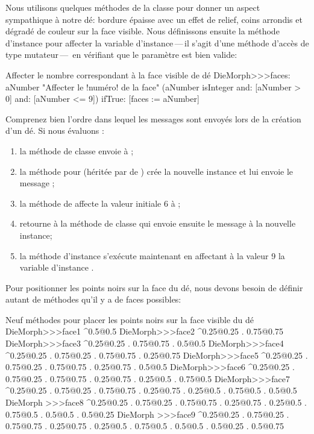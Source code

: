 \documentclass[a4paper,10pt,twoside]{book}
\begin{document}
Nous utilisons quelques méthodes de la classe 
pour donner un aspect sympathique à notre dé: bordure épaisse
avec un effet de relief, coins arrondis et dégradé de couleur sur
la face visible.
Nous définissons ensuite la méthode d'instance  pour
affecter la variable d'instance\,---\,il s'agit d'une méthode
d'accès de type mutateur\,---\, en vérifiant que le paramètre est
bien valide:
\begin{method}{Affecter le nombre correspondant à la face visible de dé}
DieMorph>>>faces: aNumber
	"Affecter le !numéro! de la face"
	(aNumber isInteger
			and: [aNumber > 0]
			and: [aNumber <= 9])
		ifTrue: [faces := aNumber]
\end{method}

Comprenez bien l'ordre dans lequel les messages sont envoyés lors de
la création d'un dé. Si nous évaluons :
\begin{enumerate}
	\item la méthode de classe  envoie
       à ;
	\item la méthode pour  (héritée par  de ) crée la nouvelle instance et lui envoie
       le message ;
	\item la méthode  de  affecte la
      valeur initiale 6 à ;
	\item {} retourne à la méthode de
      classe  qui envoie ensuite le
      message  à la nouvelle instance;
	\item la méthode d'instance  s'exécute
      maintenant en affectant à la valeur 9 la variable d'instance
      .
\end{enumerate}

Pour positionner les points noirs sur la face du dé, nous devons
besoin de définir autant de méthodes qu'il y a de faces possibles:

\begin{methods}{Neuf méthodes pour placer les points noirs sur la face visible du dé}
DieMorph>>>face1
	^{0.5@0.5}
DieMorph>>>face2
	^{0.25@0.25 . 0.75@0.75}
DieMorph>>>face3
	^{0.25@0.25 . 0.75@0.75 . 0.5@0.5}
DieMorph>>>face4
	^{0.25@0.25 . 0.75@0.25 . 0.75@0.75 . 0.25@0.75}
DieMorph>>>face5
	^{0.25@0.25 . 0.75@0.25 . 0.75@0.75 . 0.25@0.75 . 0.5@0.5}
DieMorph>>>face6
	^{0.25@0.25 . 0.75@0.25 . 0.75@0.75 . 0.25@0.75 . 0.25@0.5 . 0.75@0.5}
DieMorph>>>face7
	^{0.25@0.25 . 0.75@0.25 . 0.75@0.75 . 0.25@0.75 . 0.25@0.5 . 0.75@0.5 . 0.5@0.5}
DieMorph >>>face8
	^{0.25@0.25 . 0.75@0.25 . 0.75@0.75 . 0.25@0.75 . 0.25@0.5 . 0.75@0.5 . 0.5@0.5 . 0.5@0.25}
DieMorph >>>face9
	^{0.25@0.25 . 0.75@0.25 . 0.75@0.75 . 0.25@0.75 . 0.25@0.5 . 0.75@0.5 . 0.5@0.5 . 0.5@0.25 . 0.5@0.75}
\end{methods}
\end{document}
